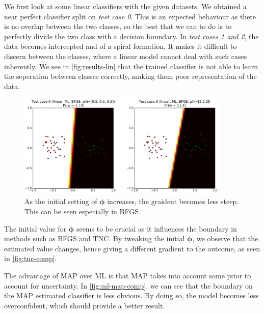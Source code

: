 \documentclass[11pt,openright,a4paper]{article}
\numberwithin{equation}{section}
\begin{document}
We first look at some linear classifiers with the given datasets. We obtained a near perfect classifier split on \textit{test case 0}. This is an expected behaviour as there is no overlap between the two classes, so the best that we can to do is to perfectly divide the two class with a decision boundary. In \textit{test cases 1 and 2}, the data becomes intercepted and of a spiral formation. It makes it difficult to discern between the classes, where a linear model cannot deal with such cases inherently. We see in \autoref{fig:results-lin} that the trained classifier is not able to learn the seperation between classes correctly, making them poor representation of the data.

\begin{figure}[H]
  \centering
  \includegraphics[width=0.9\textwidth]{tnc-comp}
    \caption{As the initial setting of $\boldsymbol\phi$ increases, the graident becomes less steep. This can be seen especially in BFGS.}
  \label{fig:tnc-comp}
\end{figure}

The initial value for $\boldsymbol\phi$ seems to be crucial as it influences the boundary in methods such as BFGS and TNC. By tweaking the initial $\boldsymbol\phi$, we observe that the estimated value changes, hence giving a different gradient to the outcome, as seen in \autoref{fig:tnc-comp}.

The advantage of MAP over ML is that MAP takes into account some prior to account for uncertainty. In \autoref{fig:ml-map-comp}, we can see that the boundary on the MAP estimated classifier is less obvious. By doing so, the model becomes less overconfident, which should provide a better result.
\end{document}

